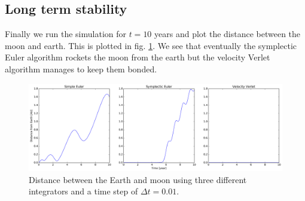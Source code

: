 \documentclass[a4paper,11pt,bibtotoc]{scrartcl}
\begin{document}
\subsection{Long term stability}

Finally we run the simulation for $t = 10$ years and plot the distance between the moon and earth. This is plotted in fig. \ref{fig:solar4}. We see that eventually the symplectic Euler algorithm rockets the moon from the earth but the velocity Verlet algorithm manages to keep them bonded.
\begin{figure}
	\includegraphics[width=1.0\linewidth]{../fig/solar4.png}
	\centering
	\caption{Distance between the Earth and moon using three different integrators and a time step of $\Delta t = 0.01$.}
	\label{fig:solar4}
\end{figure}
\end{document}
